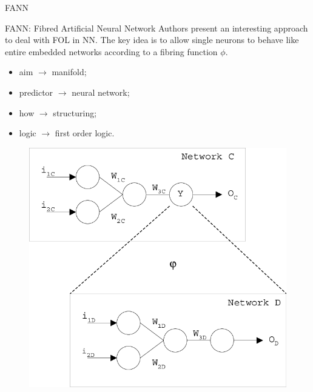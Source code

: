 \documentclass[presentation]{beamer}\mode<presentation>{\usetheme{AMSBolognaFC}}
\begin{document}
\begin{frame}[allowframebreaks]{FANN}
    \begin{block}{FANN: Fibred Artificial Neural Network }
        Authors present an interesting approach to deal with FOL in NN.
        The key idea is to allow single neurons to behave like entire embedded networks according to a fibring function $\phi$.
        \begin{itemize}
            \item aim $\rightarrow$ manifold;
            \item predictor $\rightarrow$ neural network;
            \item how $\rightarrow$ structuring;
            \item logic $\rightarrow$ first order logic.
        \end{itemize}        
    \end{block}
    
    \framebreak
    
    \begin{figure}
        \centering
        \includegraphics[height=0.8\textheight]{figures/fibring-example.png}
    \end{figure}
    
\end{frame}
\end{document}
